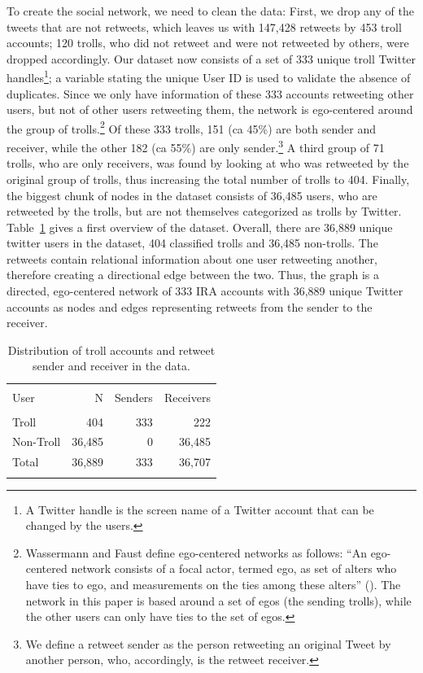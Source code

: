 \documentclass[12pt, titlepage=true, toc=bib]{scrartcl}
\begin{document}
To create the social network, we need to clean the data: First, we drop any of the tweets that are not retweets, which leaves us with 147,428 retweets by 453 troll accounts; 120 trolls, who did not retweet and were not retweeted by others, were dropped accordingly. Our dataset now consists of a set of 333 unique troll Twitter handles\footnote{A Twitter handle is the screen name of a Twitter account that can be changed by the users.}; a variable stating the unique User ID is used to validate the absence of duplicates. Since we only have information of these 333 accounts retweeting other users, but not of other users retweeting them, the network is ego-centered around the group of trolls.\footnote{Wassermann and Faust define ego-centered networks as follows: ``An ego-centered network consists of a focal actor, termed ego, as set of alters who have ties to ego, and measurements on the ties among these alters'' (\cite[42]{wasserman_social_1994}). The network in this paper is based around a set of egos (the sending trolls), while the other users can only have ties to the set of egos.} Of these 333 trolls, 151 (ca 45\%) are both sender and receiver, while the other 182 (ca 55\%) are only sender.\footnote{We define a retweet sender as the person retweeting an original Tweet by another person, who, accordingly, is the retweet receiver.} A third group of 71 trolls, who are only receivers, was found by looking at who was retweeted by the original group of trolls, thus increasing the total number of trolls to 404. Finally, the biggest chunk of nodes in the dataset consists of 36,485 users, who are retweeted by the trolls, but are not themselves categorized as trolls by Twitter. Table~\ref{tab:userstat} gives a first overview of the dataset. Overall, there are 36,889 unique twitter users in the dataset, 404 classified trolls and 36,485 non-trolls. The retweets contain relational information about one user retweeting another, therefore creating a directional edge between the two. Thus, the graph is a directed, ego-centered network of 333 IRA accounts with 36,889 unique Twitter accounts as nodes and edges representing retweets from the sender to the receiver.

\begin{table}[!ht] \centering 
\begin{tabular*}{.95\linewidth}{@{\extracolsep{\fill}} lrrr} 
\\[-1.8ex]\hline 
\hline \\[-1.8ex] 
User & N & Senders & Receivers \\ 
\hline \\[-1.8ex] 
Troll & 404 & 333 & 222 \\ 
Non-Troll & 36,485 & 0 & 36,485 \\ 
Total & 36,889 & 333 & 36,707 \\ 
\hline \\[-1.8ex] 
\end{tabular*} 
  \caption[User Statistics]{Distribution of troll accounts and retweet sender and receiver in the data.}
  \label{tab:userstat} 
\end{table} 
\end{document}
